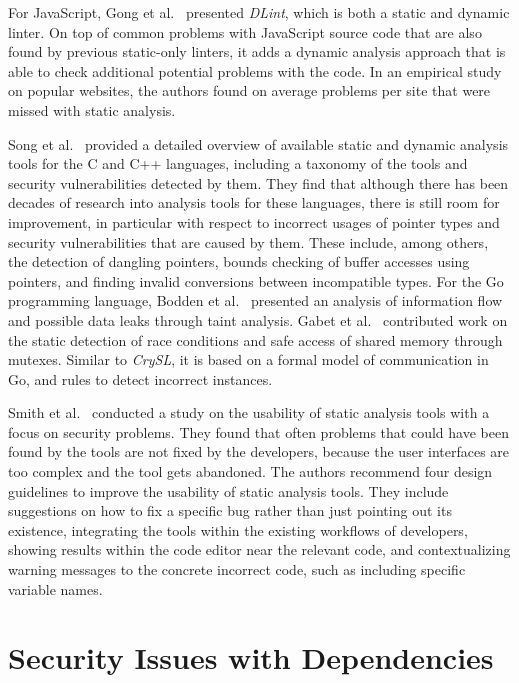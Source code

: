 For JavaScript, Gong et al.~\cite{gong2015} presented \textit{DLint}, which is both a static and dynamic linter.
On top of common problems with JavaScript source code that are also found by previous static-only linters, it adds a
dynamic analysis approach that is able to check  additional potential problems with the code.
In an empirical study on  popular websites, the authors found on average  problems
per site that were missed with static analysis.

Song et al.~\cite{song2019} provided a detailed overview of available static and dynamic analysis tools for the C and C++
languages, including a taxonomy of the tools and security vulnerabilities detected by them.
They find that although there has been decades of research into analysis tools for these languages, there is still room
for improvement, in particular with respect to incorrect usages of pointer types and security vulnerabilities that are
caused by them.
These include, among others, the detection of dangling pointers, bounds checking of buffer accesses using pointers, and
finding invalid conversions between incompatible types.
For the Go programming language, Bodden et al.~\cite{bodden2016} presented an analysis of information flow and possible
data leaks through taint analysis.
Gabet et al.~\cite{gabet2020} contributed work on the static detection of race conditions and safe access of shared
memory through mutexes.
Similar to \textit{CrySL}, it is based on a formal model of communication in Go, and rules to detect incorrect instances.

Smith et al.~\cite{smith2020} conducted a study on the usability of static analysis tools with a focus on security
problems.
They found that often problems that could have been found by the tools are not fixed by the developers, because the user
interfaces are too complex and the tool gets abandoned.
The authors recommend four design guidelines to improve the usability of static analysis tools.
They include suggestions on how to fix a specific bug rather than just pointing out its existence, integrating the tools
within the existing workflows of developers, showing results within the code editor near the relevant code, and
contextualizing warning messages to the concrete incorrect code, such as including specific variable names.



\section{Security Issues with Dependencies}\label{sec:related-work:dependency-issues}


